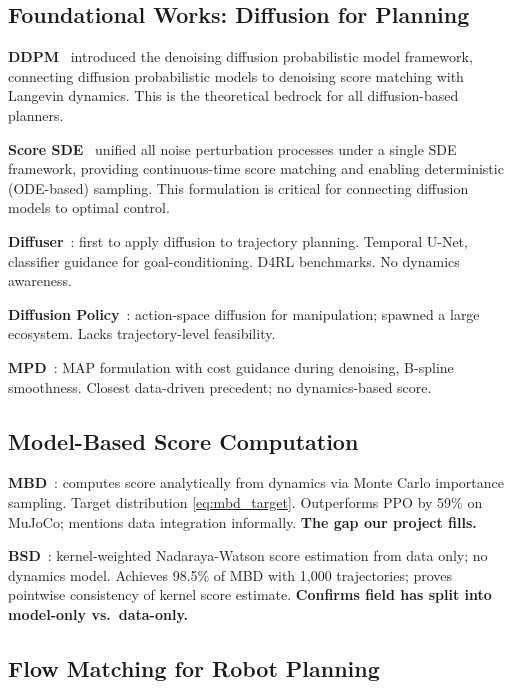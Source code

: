 \documentclass[letterpaper, 10pt, conference]{ieeeconf}
\begin{document}
\subsection{Foundational Works: Diffusion for Planning}

\textbf{DDPM}~\cite{ho2020ddpm} introduced the denoising diffusion probabilistic
model framework, connecting diffusion probabilistic models to denoising score
matching with Langevin dynamics.  This is the theoretical bedrock for all
diffusion-based planners.

\textbf{Score SDE}~\cite{song2021score} unified all noise perturbation processes
under a single SDE framework, providing continuous-time score matching and
enabling deterministic (ODE-based) sampling.  This formulation is critical for
connecting diffusion models to optimal control.

\textbf{Diffuser}~\cite{janner2022}: first to apply diffusion to
trajectory planning. Temporal U-Net, classifier guidance for goal-conditioning.
D4RL benchmarks. No dynamics awareness.

\textbf{Diffusion Policy}~\cite{chi2023diffusionpolicy}: action-space diffusion
for manipulation; spawned a large ecosystem. Lacks trajectory-level feasibility.

\textbf{MPD}~\cite{carvalho2023mpd}: MAP formulation with cost guidance during
denoising, B-spline smoothness. Closest data-driven precedent; no dynamics-based
score.

\subsection{Model-Based Score Computation}

\textbf{MBD}~\cite{mbd}: computes score analytically from dynamics via
Monte Carlo importance sampling. Target distribution \eqref{eq:mbd_target}.
Outperforms PPO by 59\% on MuJoCo; mentions data integration informally.
\textbf{The gap our project fills.}

\textbf{BSD}~\cite{bsd}: kernel-weighted Nadaraya-Watson score estimation
from data only; no dynamics model. Achieves 98.5\% of MBD with 1,000
trajectories; proves pointwise consistency of kernel score estimate.
\textbf{Confirms field has split into model-only vs.\ data-only.}

\subsection{Flow Matching for Robot Planning}
\end{document}
